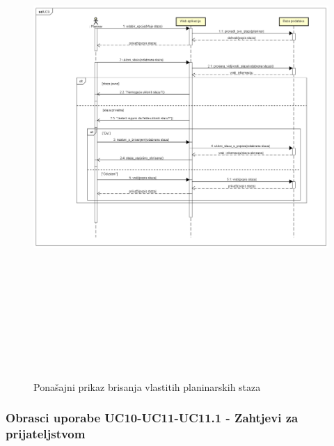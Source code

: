 				\begin{figure}[H]
					\includegraphics[scale=1.5, width=165mm, height=190mm]{dijagrami/seq-UC9.png} %
					\centering
					\caption{Ponašajni prikaz brisanja vlastitih planinarskih staza}
					\label{fig:sekvencijski dijagrami}
				\end{figure}
				\newpage
				\subsubsection{Obrasci uporabe UC10-UC11-UC11.1 - Zahtjevi za prijateljstvom}

